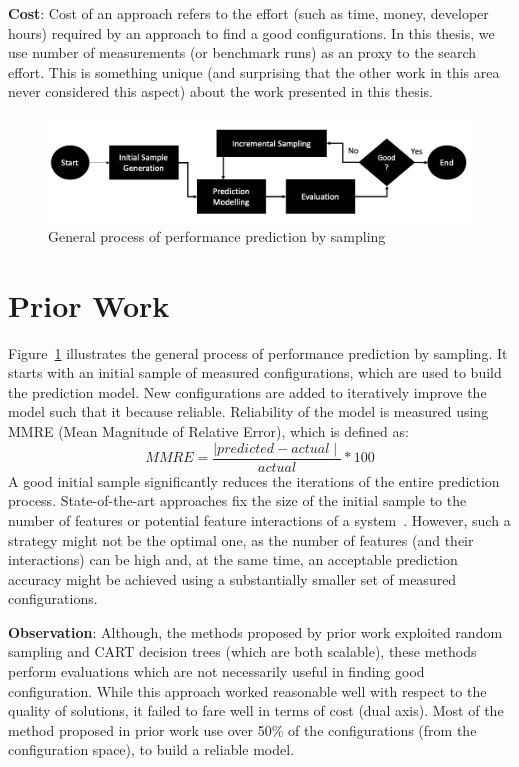 \noindent\textbf{Cost}: Cost of an approach refers to the effort (such as time, money, developer hours) required by an approach to find a good configurations. In this thesis, we use number of measurements (or benchmark runs) as an proxy to the search effort. This is something unique (and surprising that the other work in this area never considered this aspect) about the work presented in this thesis. 

\begin{figure}[!htbp]
    \centering
    \includegraphics[width=0.8\linewidth]{Chapter-Introduction/Figures/sampling_process.png}
    \caption{General process of performance prediction by sampling}
    \label{fig:chap1_sampling_process}
\end{figure}

\section{Prior Work}
Figure~\ref{fig:chap1_sampling_process} illustrates the general process of performance prediction by sampling. It starts with
an initial sample of measured configurations, which are used to build the prediction model. New configurations are added to iteratively improve the model such that it because reliable. Reliability of the model is measured using MMRE (Mean Magnitude of Relative Error), which is defined as:
\begin{equation}
\mathit{MMRE}=\frac{\mid\mathit{predicted} - \mathit{actual}\mid}{\mathit{actual}}*100
\end{equation}
A good initial sample significantly reduces the iterations of the entire prediction process. State-of-the-art
approaches fix the size of the initial sample to the number of features or potential feature
interactions of a system~\cite{siegmund2012predicting, guo2013variability, sarkar2015cost, jamshidi2016uncertainty}. However, such a strategy might not be the optimal one, as the
number of features (and their interactions) can be high and, at the same time, an acceptable prediction
accuracy might be achieved using a substantially smaller set of measured configurations.

\noindent\textbf{Observation}: Although, the methods proposed by prior work exploited random sampling and CART decision trees (which are both scalable), these methods perform evaluations which are not necessarily useful in finding good configuration. While this approach worked reasonable well with respect to the quality of solutions, it failed to fare well in terms of cost (dual axis). Most of the method proposed in prior work use over 50\% of the configurations (from the configuration space), to build a reliable model. 


